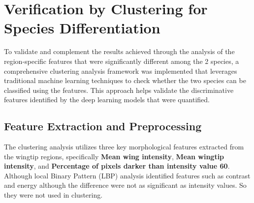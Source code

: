 \documentclass[a4paper,12pt]{report}
\begin{document}




\section{Verification by Clustering for Species Differentiation}

To validate and complement the results achieved through the analysis of the region-specific features that were significantly different among the 2 species, a comprehensive clustering analysis framework was implemented that leverages traditional machine learning techniques to check whether the two species can be classified using the features. This approach helps validate the discriminative features identified by the deep learning models that were quantified.

\subsection{Feature Extraction and Preprocessing}

The clustering analysis utilizes three key morphological features extracted from the wingtip regions, specifically \textbf{Mean wing intensity}, \textbf{Mean wingtip intensity}, and \textbf{Percentage of pixels darker than intensity value 60}. Although local Binary Pattern (LBP) analysis identified features such as contrast and energy although the difference were not as significant as intensity values. So they were not used in clustering.
\end{document}
